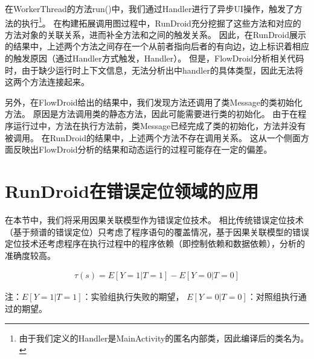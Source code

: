 
在WorkerThread的方法run()中，我们通过Handler进行了异步UI操作，触发了方法的执行\footnote{由于我们定义的Handler是MainActivity的匿名内部类，因此编译后的类名为。}。
在构建拓展调用图过程中，RunDroid充分挖掘了这些方法和对应的方法对象的关联关系，进而补全方法和之间的触发关系。
因此，在RunDroid展示的结果中，上述两个方法之间存在一个从前者指向后者的有向边，边上标识着相应的触发原因（通过Handler方式触发，Handler）。
但是，FlowDroid分析相关代码时，由于缺少运行时上下文信息，无法分析出中handler的具体类型，因此无法将这两个方法连接起来。






另外，在FlowDroid给出的结果中，我们发现方法还调用了类{Message}的类初始化方法。
原因是方法调用类的静态方法，因此可能需要进行类的初始化。
由于在程序运行过中，方法在执行方法前，类{Message}已经完成了类的初始化，方法并没有被调用。
在RunDroid的结果中，上述两个方法不存在调用关系。
这从一个侧面方面反映出FlowDroid分析的结果和动态运行的过程可能存在一定的偏差。





\section{RunDroid在错误定位领域的应用}
在本节中，我们将采用因果关联模型\cite{baah2010causal,baah2011mitigating}作为错误定位技术。
相比传统错误定位技术（基于频谱的错误定位）只考虑了程序语句的覆盖情况，基于因果关联模型的错误定位技术还考虑程序在执行过程中的程序依赖（即控制依赖和数据依赖），分析的准确度较高。



\begin{equation}
\begin{aligned}
\tau(s) = E[Y=1|T=1] - E [Y=0|T=0] 
\end{aligned}
\label{equ:expectEquation} 
\end{equation}
\begin{scriptsize}
	注：$E[Y=1|T=1]$：实验组执行失败的期望， $E[Y=0|T=0]$：对照组执行通过的期望。
\end{scriptsize}


